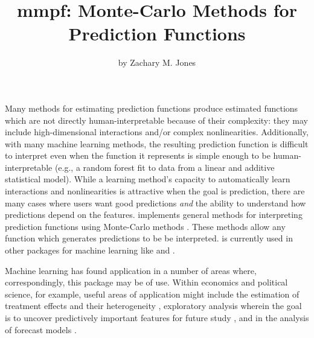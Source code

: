 \title{mmpf: Monte-Carlo Methods for Prediction Functions}
\author{by Zachary M. Jones}

\maketitle


Many methods for estimating prediction functions produce estimated functions which are not directly human-interpretable because of their complexity: they may include high-dimensional interactions and/or complex nonlinearities. Additionally, with many machine learning methods, the resulting prediction function is difficult to interpret even when the function it represents is simple enough to be human-interpretable (e.g., a random forest fit to data from a linear and additive statistical model). While a learning method's capacity to automatically learn interactions and nonlinearities is attractive when the goal is prediction, there are many cases where users want good predictions \textit{and} the ability to understand how predictions depend on the features.  implements general methods for interpreting prediction functions using Monte-Carlo methods \citep{friedman2001greedy}. These methods allow any function which generates predictions to be be interpreted.  is currently used in other packages for machine learning like  and  \citep{jones2016,JMLR:v17:15-066}.

Machine learning has found application in a number of areas where, correspondingly, this package may be of use. Within economics and political science, for example, useful areas of application might include the estimation of treatment effects and their heterogeneity \citep{doi:10.1162/003465304323023651,athey2017state}, exploratory analysis wherein the goal is to uncover predictively important features for future study \citep{LupuJones,hill2014empirical}, and in the analysis of forecast models \citep{berk2009forecasting,blair2017predicting}.

